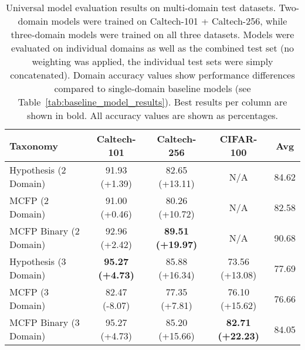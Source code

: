 \begin{table}[ht]
\centering
\caption{Universal model evaluation results on multi-domain test datasets. Two-domain models were trained on Caltech-101 + Caltech-256, while three-domain models were trained on all three datasets. Models were evaluated on individual domains as well as the combined test set (no weighting was applied, the individual test sets were simply concatenated). Domain accuracy values show performance differences compared to single-domain baseline models (see Table~\ref{tab:baseline_model_results}). Best results per column are shown in bold. All accuracy values are shown as percentages.}
\label{tab:universal_model_results}
\begin{tabular}{lcccc}
\toprule
Taxonomy & Caltech-101 & Caltech-256 & CIFAR-100 & Avg \\
\midrule
Hypothesis (2 Domain) & 91.93 (+1.39) & 82.65 (+13.11) & N/A & 84.62 \\
MCFP (2 Domain) & 91.00 (+0.46) & 80.26 (+10.72) & N/A & 82.58 \\
MCFP Binary (2 Domain) & 92.96 (+2.42) & \textbf{89.51 (+19.97)} & N/A & 90.68 \\
Hypothesis (3 Domain) & \textbf{95.27 (+4.73)} & 85.88 (+16.34) & 73.56 (+13.08) & 77.69 \\
MCFP (3 Domain) & 82.47 (-8.07) & 77.35 (+7.81) & 76.10 (+15.62) & 76.66 \\
MCFP Binary (3 Domain) & 95.27 (+4.73) & 85.20 (+15.66) & \textbf{82.71 (+22.23)} & 84.05 \\
\bottomrule
\end{tabular}
\end{table}
